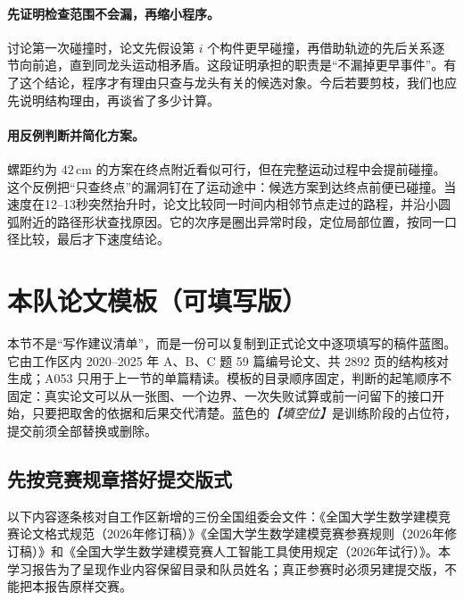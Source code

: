 \documentclass[UTF8,zihao=-4]{ctexart}
\newcommand{\slot}[1]{\textcolor{inkblue}{\textit{【#1】}}}
\begin{document}
\paragraph{先证明检查范围不会漏，再缩小程序。}
讨论第一次碰撞时，论文先假设第 $i$ 个构件更早碰撞，再借助轨迹的先后关系逐节向前追，直到同龙头运动相矛盾。这段证明承担的职责是“不漏掉更早事件”。有了这个结论，程序才有理由只查与龙头有关的候选对象。今后若要剪枝，我们也应先说明结构理由，再谈省了多少计算。

\paragraph{用反例判断并简化方案。}
螺距约为 $42\,\mathrm{cm}$ 的方案在终点附近看似可行，但在完整运动过程中会提前碰撞。这个反例把“只查终点”的漏洞钉在了运动途中：候选方案到达终点前便已碰撞。当速度在12--13秒突然抬升时，论文比较同一时间内相邻节点走过的路程，并沿小圆弧附近的路径形状查找原因。它的次序是圈出异常时段，定位局部位置，按同一口径比较，最后才下速度结论。


\section{本队论文模板（可填写版）}

本节不是“写作建议清单”，而是一份可以复制到正式论文中逐项填写的稿件蓝图。它由工作区内 2020--2025 年 A、B、C 题 59 篇编号论文、共 2892 页的结构核对生成\cite{corpus59}；A053 只用于上一节的单篇精读。模板的目录顺序固定，判断的起笔顺序不固定：真实论文可以从一张图、一个边界、一次失败试算或前一问留下的接口开始，只要把取舍的依据和后果交代清楚。蓝色的\slot{填空位}是训练阶段的占位符，提交前须全部替换或删除。

\subsection{先按竞赛规章搭好提交版式}

以下内容逐条核对自工作区新增的三份全国组委会文件：《全国大学生数学建模竞赛论文格式规范（2026年修订稿）》《全国大学生数学建模竞赛参赛规则（2026年修订稿）》和《全国大学生数学建模竞赛人工智能工具使用规定（2026年试行）》\cite{format2026,rules2026,ai2026}。本学习报告为了呈现作业内容保留目录和队员姓名；真正参赛时必须另建提交版，不能把本报告原样交赛。
\end{document}
